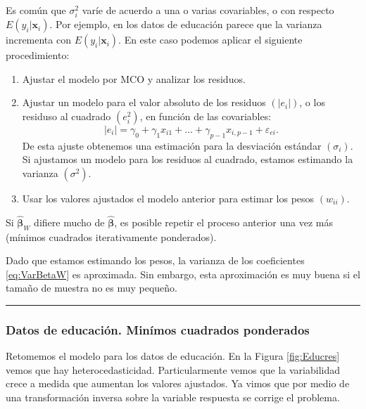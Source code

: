 \documentclass[
]{article}
\providecommand{\tightlist}{%
  \setlength{\itemsep}{0pt}\setlength{\parskip}{0pt}}
\begin{document}
Es común que \(\sigma^{2}_{i}\) varíe de acuerdo a una o varias covariables, o con respecto \(E(y_{i}|\boldsymbol x_{i})\). Por ejemplo, en los datos de educación parece que la varianza incrementa con \(E(y_{i}| \boldsymbol x_{i})\). En este caso podemos aplicar el siguiente procedimiento:

\begin{enumerate}
\def\labelenumi{\arabic{enumi}.}
\tightlist
\item
  Ajustar el modelo por MCO y analizar los residuos.
\item
  Ajustar un modelo para el valor absoluto de los residuos \((|e_{i}|)\), o los residuso al cuadrado \((e^{2}_{i})\), en función de las covariables:
  \[
  |e_{i}| = \gamma_{0} + \gamma_{1}x_{i1}+ \ldots + \gamma_{p-1}x_{i,p-1} + \varepsilon_{ei}.
  \]
  De esta ajuste obtenemos una estimación para la desviación estándar \((\sigma_{i})\). Si ajustamos un modelo para los residuos al cuadrado, estamos estimando la varianza \((\sigma^{2})\).
\item
  Usar los valores ajustados el modelo anterior para estimar los pesos \((w_{ii})\).
\end{enumerate}

Si \(\widehat{\boldsymbol \beta}_{W}\) difiere mucho de \(\widehat{\boldsymbol \beta}\), es posible repetir el proceso anterior una vez más (mínimos cuadrados iterativamente ponderados).

Dado que estamos estimando los pesos, la varianza de los coeficientes \eqref{eq:VarBetaW} es aproximada. Sin embargo, esta aproximación es muy buena si el tamaño de muestra no es muy pequeño.

\rule{\textwidth}{0.4pt}

\hypertarget{datos-de-educaciuxf3n.-minuxedmos-cuadrados-ponderados}{%
\subsubsection*{Datos de educación. Minímos cuadrados ponderados}\label{datos-de-educaciuxf3n.-minuxedmos-cuadrados-ponderados}}

Retomemos el modelo para los datos de educación. En la Figura \ref{fig:Educres} vemos que hay heterocedasticidad. Particularmente vemos que la variabilidad crece a medida que aumentan los valores ajustados. Ya vimos que por medio de una transformación inversa sobre la variable respuesta se corrige el problema.
\end{document}
